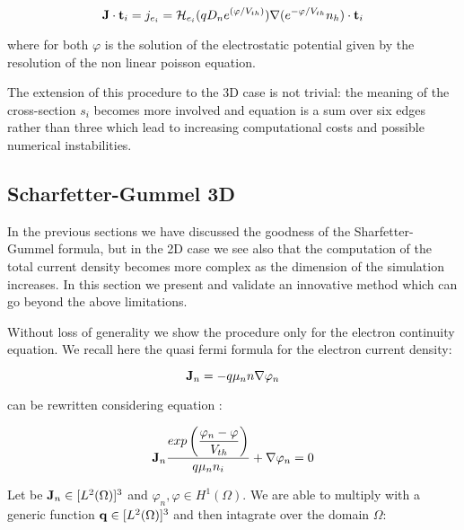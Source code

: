 \begin{equation}
\mathbf{J}\cdot \mathbf{t}_i = j_{e_i}  = \mathcal{H}_{e_i}(qD_n e^{(\varphi/V_{th})}) \nabla (e^{-\varphi / V_{th}}n_h) \cdot \mathbf{t}_i
\end{equation}

where for both $\varphi$ is the solution of the electrostatic potential given by the resolution of the non linear poisson equation.

The extension of this procedure to the 3D case is not trivial: the meaning of the cross-section $s_i$ becomes more involved and equation  is a sum over six edges rather than three which lead to increasing computational costs and possible numerical instabilities.


\subsection{Scharfetter-Gummel 3D}
 
In the previous sections we have discussed the goodness of the Sharfetter-Gummel formula, but in the 2D case we see also that the computation of the total current density becomes more complex as the dimension of the simulation increases. In this section we present and validate an innovative method which can go beyond the above limitations.

Without loss of generality we show the procedure only for the electron continuity equation.
We recall here the quasi fermi formula for the electron current density:

\begin{equation}
\label{eq: current density fermi}
\mathbf{J}_n=-q \mu_n n \nabla \varphi_n
\end{equation}

 can be rewritten considering equation :

\begin{equation}
\label{eq: current density canonic form}
\mathbf{J}_n\dfrac{ exp\left(\dfrac{\varphi_n-\varphi}{V_{th}}\right)}{q \mu_n n_i} + \nabla \varphi_n = 0
\end{equation}

Let be $\mathbf{J}_n\in[L^2(\Omega)]^3$ and $\varphi_n,\varphi \in H^1(\Omega)$. We are able to multiply  with a generic function $\mathbf{q}\in[L^2(\Omega)]^3$ and then intagrate over the domain $\Omega$:

